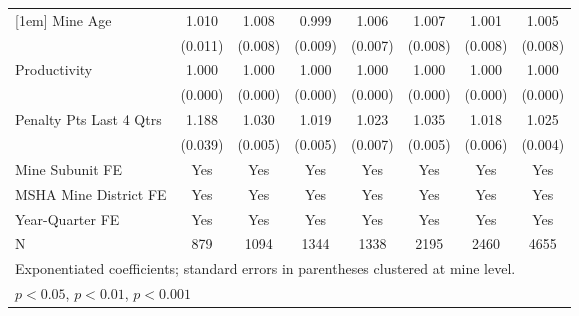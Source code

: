 {\begin{tabular}{l*{7}{c}}
[1em]
Mine Age                 &       1.010         &       1.008         &       0.999         &       1.006         &       1.007         &       1.001         &       1.005         \\
                         &     (0.011)         &     (0.008)         &     (0.009)         &     (0.007)         &     (0.008)         &     (0.008)         &     (0.008)         \\
[1em]
Productivity             &       1.000         &       1.000         &       1.000         &       1.000         &       1.000         &       1.000         &       1.000         \\
                         &     (0.000)         &     (0.000)         &     (0.000)         &     (0.000)         &     (0.000)         &     (0.000)         &     (0.000)         \\
[1em]
Penalty Pts Last 4 Qtrs  &       1.188\sym{***}&       1.030\sym{***}&       1.019\sym{***}&       1.023\sym{***}&       1.035\sym{***}&       1.018\sym{***}&       1.025\sym{***}\\
                         &     (0.039)         &     (0.005)         &     (0.005)         &     (0.007)         &     (0.005)         &     (0.006)         &     (0.004)         \\
[1em]
Mine Subunit FE          &         Yes         &         Yes         &         Yes         &         Yes         &         Yes         &         Yes         &         Yes         \\
[1em]
MSHA Mine District FE    &         Yes         &         Yes         &         Yes         &         Yes         &         Yes         &         Yes         &         Yes         \\
[1em]
Year-Quarter FE          &         Yes         &         Yes         &         Yes         &         Yes         &         Yes         &         Yes         &         Yes         \\
\hline
N                        &         879         &        1094         &        1344         &        1338         &        2195         &        2460         &        4655         \\
\hline\hline
\multicolumn{8}{l}{\footnotesize Exponentiated coefficients; standard errors in parentheses clustered at mine level.}\\
\multicolumn{8}{l}{\footnotesize \sym{*} \(p<0.05\), \sym{**} \(p<0.01\), \sym{***} \(p<0.001\)}\\
\end{tabular}
}
